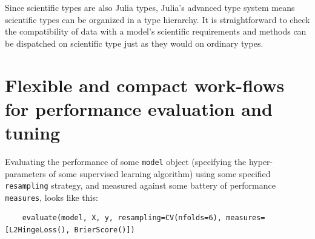 \documentclass{article}
\begin{document}

Since scientific types are also Julia types, Julia's advanced type
system means scientific types can be organized in a type hierarchy.
It is straightforward to check the compatibility of data with a
model's scientific requirements and methods can be dispatched on
scientific type just as they would on ordinary types.





\section{Flexible and compact work-flows for performance evaluation and tuning}

Evaluating the performance of some \texttt{model} object (specifying
the hyper-parameters of some supervised learning algorithm) using some
specified \texttt{resampling} strategy, and measured against some
battery of performance \texttt{measures}, looks like this:

{\small
\begin{verbatim}
    evaluate(model, X, y, resampling=CV(nfolds=6), measures=[L2HingeLoss(), BrierScore()])
\end{verbatim}
}

\end{document}
